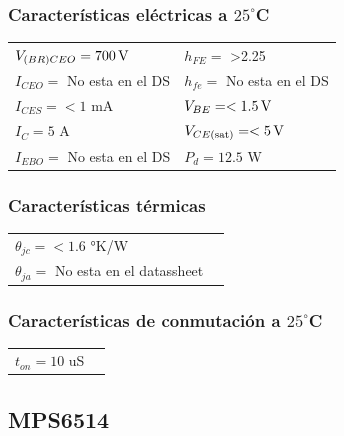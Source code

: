\documentclass[chaptersright]{informeutn}
\begin{document}
   \subsubsection{Características eléctricas a $25^\circ$C}
    \begin{tabular}{ll}
    $V_{(BR)CEO} =  700 \,\mathrm{V}$         & \hspace{2cm} $h_{FE} =$ >2.25 \\
    $I_{CEO} = $ No esta en el DS           & \hspace{2cm} $h_{fe} = $ No esta en el DS \\
    $I_{CES} = <1 $ mA               & \hspace{2cm} $V_{BE} = <1.5 \,\mathrm{V} $ \\
    $I_C = 5$ A                & \hspace{2cm} $V_{CE(\text{sat})} = <5 \,\mathrm{V} $ \\
    $I_{EBO} = $ No esta en el DS              & \hspace{2cm} $P_d = 12.5$ W \\
    \end{tabular}
    
    \subsubsection{Características térmicas}
    \begin{tabular}{ll}
    $\theta_{jc} = <1.6$ °K/W \\
    $\theta_{ja} = $ No esta en el datassheet \\
    \end{tabular}
    
    \subsubsection{Características de conmutación a $25^\circ$C}
    \begin{tabular}{ll}
    $t_{on} = 10$ uS \\
    \end{tabular}

  \subsection{MPS6514}
\end{document}
